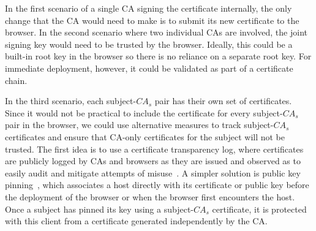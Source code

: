 In the first scenario of a single CA signing the certificate internally, the only change that the CA would need to make is to submit its new certificate to the browser. In the second scenario where two individual CAs are involved, the joint signing key would need to be trusted by the browser. Ideally, this could be a built-in root key in the browser so there is no reliance on a separate root key. For immediate deployment, however, it could be validated as part of a certificate chain.

In the third scenario, each subject-$CA_s$ pair has their own set of certificates. Since it would not be practical to include the certificate for every subject-$CA_s$ pair in the browser, we could use alternative measures to track subject-$CA_s$ certificates and ensure that CA-only certificates for the subject will not be trusted. 
The first idea is to use a certificate transparency log, where certificates are publicly logged by CAs and browsers as they are issued and observed as to easily audit and mitigate attempts of misuse~\cite{certificate_transparency}. A simpler solution is public key pinning~\cite{public_key_pinning}, which associates a host directly with its certificate or public key before the deployment of the browser or when the browser first encounters the host.  Once a subject has pinned its key using a subject-$CA_s$ certificate, it is protected with this client from a certificate generated independently by the CA.

